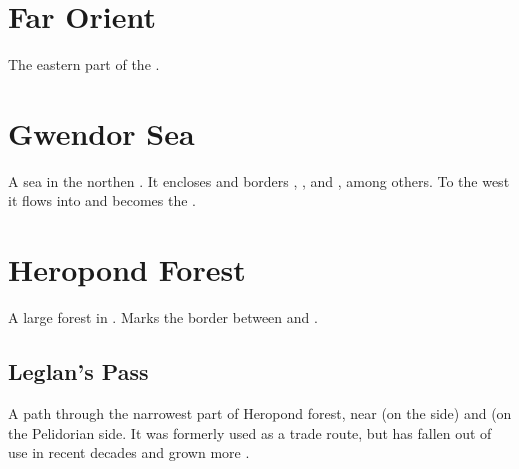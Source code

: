 \section{Far Orient}
The eastern part of the . 















\section{Gwendor Sea}
A sea in the northen . It encloses  and borders , ,  and , among others. To the west it flows into and becomes the . 















\section{Heropond Forest}
A large \Wylde{} forest in . Marks the border between  and . 









\subsection{Leglan's Pass}
A path through the narrowest part of Heropond forest, near  (on the \Scyric{} side) and \Redglen{} (on the Pelidorian side. 
It was formerly used as a trade route, but has fallen out of use in recent decades and grown more . 















